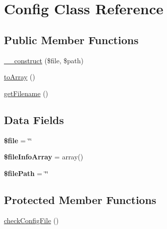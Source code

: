 \hypertarget{class_anemo_1_1_config}{
\section{Config Class Reference}
\label{class_anemo_1_1_config}
}
\subsection*{Public Member Functions}
\begin{DoxyCompactItemize}
\item 
\hyperlink{class_anemo_1_1_config_a753fa8c115c4fdb121102d927b168321}{\_\-\_\-construct} (\$file, \$path)
\item 
\hyperlink{class_anemo_1_1_config_a658defb34762c8f40085aec87e16ba1a}{toArray} ()
\item 
\hyperlink{class_anemo_1_1_config_a2982abe8d7b767602a1485dfb4cf653d}{getFilename} ()
\end{DoxyCompactItemize}
\subsection*{Data Fields}
\begin{DoxyCompactItemize}
\item 
\hypertarget{class_anemo_1_1_config_aa1bfbd27060176201b271918dff57e8f}{
{\bfseries \$file} = \char`\"{}\char`\"{}}
\label{class_anemo_1_1_config_aa1bfbd27060176201b271918dff57e8f}

\item 
\hypertarget{class_anemo_1_1_config_a778c74a2d53fd6c56b34d785b54efdab}{
{\bfseries \$fileInfoArray} = array()}
\label{class_anemo_1_1_config_a778c74a2d53fd6c56b34d785b54efdab}

\item 
\hypertarget{class_anemo_1_1_config_aaf525367b205eb15e464b979a035e4c6}{
{\bfseries \$filePath} = \char`\"{}\char`\"{}}
\label{class_anemo_1_1_config_aaf525367b205eb15e464b979a035e4c6}

\end{DoxyCompactItemize}
\subsection*{Protected Member Functions}
\begin{DoxyCompactItemize}
\item 
\hyperlink{class_anemo_1_1_config_af753b6759710052b90a7adc34500bf34}{checkConfigFile} ()
\end{DoxyCompactItemize}


